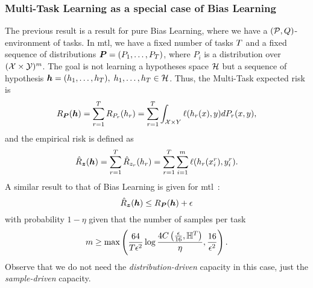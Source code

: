 \subsubsection*{Multi-Task Learning as a special case of Bias Learning}
The previous result is a result for pure Bias Learning, where we have a $(\mathcal{P}, Q)$-environment of tasks. In \acrshort{mtl}, we have a fixed number of tasks $T$ and a fixed sequence of distributions $\bm{P} = (P_1, \ldots, P_T)$, where $P_i$ is a distribution over $(\mathcal{X} \times \mathcal{Y})^m$. The goal is not learning a hypotheses space $\mathcal{H}$ but a sequence of hypothesis $\bm{h} = (h_1, \ldots, h_T),\; h_1, \ldots, h_T \in \mathcal{H} $. Thus, the Multi-Task expected risk is
\begin{equation}\label{eq:mtlearn_exprisk}
    \risk_{\bprobseq}(\myvec{\hypf}) = \sum_{r=1}^\ntasks \risk_{P_r}(\hypf_r)  = \sum_{r=1}^\ntasks \int_{\Xspace \times Y} \lossf(\hypf_r(x), y) d{P_r}(x, y),
\end{equation}
and the empirical risk is defined as
\begin{equation}\label{eq:mtlearn_emprisk}
    \bemprisk(\myvec{\hypf}) = \sum_{r=1}^\ntasks \hat{\risk}_{\sample_r}(\hypf_r) = \sum_{r=1}^\ntasks \sum_{i=1}^m \lossf(\hypf_r(x_i^r), y_i^r).
\end{equation}
A similar result to that of Bias Learning is given for \acrshort{mtl}~\cite[Theorem~4]{baxter2000model}:
\begin{equation}
    \nonumber
    \hat{R}_{\bm{z}}(\bm{h}) \leq R_{\bm{P}}(\bm{h}) + \epsilon
\end{equation}
with probability $1 - \eta$ given that the number of samples per task
\begin{equation}
    \nonumber
    m \geq \max \left( \frac{64}{T \epsilon^2} \log\frac{4C\left(\frac{\epsilon}{16}, \mathbb{H}^{T}\right)}{\eta} , \frac{16}{\epsilon^2}\right).
\end{equation}
Observe that we do not need the \emph{distribution-driven} capacity in this case, just the \emph{sample-driven} capacity.
